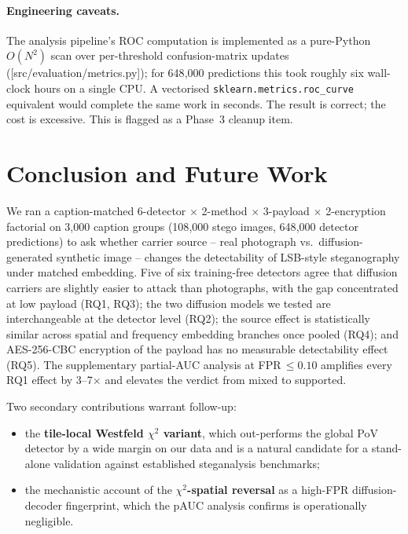 \documentclass[10pt,twocolumn,a4paper]{article}
\begin{document}
\paragraph{Engineering caveats.} The analysis pipeline's ROC computation is implemented as a pure-Python $O(N^2)$ scan over per-threshold confusion-matrix updates ([src/evaluation/metrics.py]); for 648{,}000 predictions this took roughly six wall-clock hours on a single CPU. A vectorised \texttt{sklearn.metrics.roc\_curve} equivalent would complete the same work in seconds. The result is correct; the cost is excessive. This is flagged as a Phase~3 cleanup item.

\section{Conclusion and Future Work}
\label{sec:conclusion}

We ran a caption-matched 6-detector $\times$ 2-method $\times$ 3-payload $\times$ 2-encryption factorial on 3{,}000 caption groups (108{,}000 stego images, 648{,}000 detector predictions) to ask whether carrier source -- real photograph vs.\ diffusion-generated synthetic image -- changes the detectability of LSB-style steganography under matched embedding. Five of six training-free detectors agree that diffusion carriers are slightly easier to attack than photographs, with the gap concentrated at low payload (RQ1, RQ3); the two diffusion models we tested are interchangeable at the detector level (RQ2); the source effect is statistically similar across spatial and frequency embedding branches once pooled (RQ4); and AES-256-CBC encryption of the payload has no measurable detectability effect (RQ5). The supplementary partial-AUC analysis at FPR\,$\leq\!0.10$ amplifies every RQ1 effect by 3--7$\times$ and elevates the verdict from mixed to supported.

Two secondary contributions warrant follow-up:
\begin{itemize}
\item the \textbf{tile-local Westfeld $\chi^2$ variant}, which out-performs the global PoV detector by a wide margin on our data and is a natural candidate for a stand-alone validation against established steganalysis benchmarks;
\item the mechanistic account of the \textbf{$\chi^2$-spatial reversal} as a high-FPR diffusion-decoder fingerprint, which the pAUC analysis confirms is operationally negligible.
\end{itemize}
\end{document}
